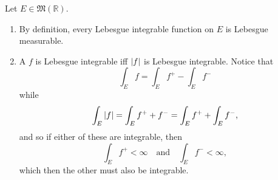 \documentclass[notoc,notitlepage]{tufte-book}
\begin{document}
\begin{remark}
  Let $E \in \mathfrak{M}(\mathbb{R})$.
  \begin{enumerate}
    \item By definition, every Lebesgue integrable function on $E$ is Lebesgue
      measurable.
    \item A  $f$ is Lebesgue integrable iff
      $\left|f\right|$ is Lebesgue integrable. Notice that
      \begin{equation*}
        \int_{E} f = \int_{E} f^+ - \int_{E} f^-
      \end{equation*}
      while
      \begin{equation*}
        \int_{E} \left|f\right| = \int_{E} f^+ + f^- = \int_{E} f^+ + \int_{E} f^-,
      \end{equation*}
      and so if either of these are integrable, then
      \begin{equation*}
        \int_{E} f^+ < \infty \quad \text{and} \quad \int_{E} f^- < \infty,
      \end{equation*}
      which then the other must also be integrable.


\end{enumerate}
\end{remark}
\end{document}
